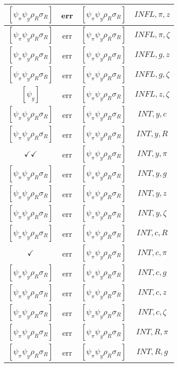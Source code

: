 \documentclass[a4paper,10pt]{article}
\begin{document}
\begin{longtable}{|c|c|c|c|}
\hline
$[\psi_\pi \psi_y \rho_R \sigma_R ]$ & err & $[\psi_\pi \psi_y \rho_R \sigma_R ]$ & ${INFL},{\pi},{z}$ \\
\hline
$[\psi_\pi \psi_y \rho_R \sigma_R ]$ & err & $[\psi_\pi \psi_y \rho_R \sigma_R ]$ & ${INFL},{\pi},{\zeta}$ \\
\hline
$[\psi_\pi \psi_y \rho_R \sigma_R ]$ & err & $[\psi_\pi \psi_y \rho_R \sigma_R ]$ & ${INFL},{g},{z}$ \\
\hline
$[\psi_\pi \psi_y \rho_R \sigma_R ]$ & err & $[\psi_\pi \psi_y \rho_R \sigma_R ]$ & ${INFL},{g},{\zeta}$ \\
\hline
$[\psi_y ]$ & err & $[\psi_\pi \psi_y \rho_R \sigma_R ]$ & ${INFL},{z},{\zeta}$ \\
\hline
$[\psi_\pi \psi_y \rho_R \sigma_R ]$ & err & $[\psi_\pi \psi_y \rho_R \sigma_R ]$ & ${INT},{y},{c}$ \\
\hline
$[\psi_\pi \psi_y \rho_R \sigma_R ]$ & err & $[\psi_\pi \psi_y \rho_R \sigma_R ]$ & ${INT},{y},{R}$ \\
\hline
$\checkmark\checkmark$ & err & $[\psi_\pi \psi_y \rho_R \sigma_R ]$ & ${INT},{y},{\pi}$ \\
\hline
$[\psi_\pi \psi_y \rho_R \sigma_R ]$ & err & $[\psi_\pi \psi_y \rho_R \sigma_R ]$ & ${INT},{y},{g}$ \\
\hline
$[\psi_\pi \psi_y \rho_R \sigma_R ]$ & err & $[\psi_\pi \psi_y \rho_R \sigma_R ]$ & ${INT},{y},{z}$ \\
\hline
$[\psi_\pi \psi_y \rho_R \sigma_R ]$ & err & $[\psi_\pi \psi_y \rho_R \sigma_R ]$ & ${INT},{y},{\zeta}$ \\
\hline
$[\psi_\pi \psi_y \rho_R \sigma_R ]$ & err & $[\psi_\pi \psi_y \rho_R \sigma_R ]$ & ${INT},{c},{R}$ \\
\hline
$\checkmark$ & err & $[\psi_\pi \psi_y \rho_R \sigma_R ]$ & ${INT},{c},{\pi}$ \\
\hline
$[\psi_\pi \psi_y \rho_R \sigma_R ]$ & err & $[\psi_\pi \psi_y \rho_R \sigma_R ]$ & ${INT},{c},{g}$ \\
\hline
$[\psi_\pi \psi_y \rho_R \sigma_R ]$ & err & $[\psi_\pi \psi_y \rho_R \sigma_R ]$ & ${INT},{c},{z}$ \\
\hline
$[\psi_\pi \psi_y \rho_R \sigma_R ]$ & err & $[\psi_\pi \psi_y \rho_R \sigma_R ]$ & ${INT},{c},{\zeta}$ \\
\hline
$[\psi_\pi \psi_y \rho_R \sigma_R ]$ & err & $[\psi_\pi \psi_y \rho_R \sigma_R ]$ & ${INT},{R},{\pi}$ \\
\hline
$[\psi_\pi \psi_y \rho_R \sigma_R ]$ & err & $[\psi_\pi \psi_y \rho_R \sigma_R ]$ & ${INT},{R},{g}$ \\

\end{longtable}
\end{document}
